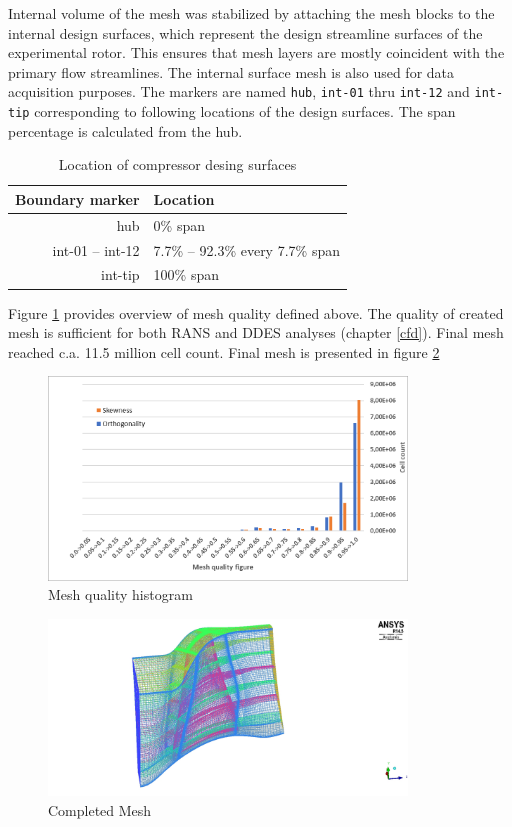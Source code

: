 Internal volume of the mesh was stabilized by attaching the mesh blocks to the internal design surfaces, which represent the design streamline surfaces of the experimental rotor. This ensures that mesh layers are mostly coincident with the primary flow streamlines. The internal surface mesh is also used for data acquisition purposes. The markers are named \texttt{hub}, \texttt{int-01} thru \texttt{int-12} and \texttt{int-tip} corresponding to following locations of the design surfaces. The span percentage is calculated from the hub.

\begin{table}[htb!]
\centering
\caption{Location of compressor desing surfaces} \label{tab:surfs}
\ttfamily
\begin{tabular}{@{}rl@{}}
\toprule
Boundary marker & Location \\ \midrule
hub & 0\% span  \\
int-01 -- int-12 & 7.7\% -- 92.3\% every 7.7\% span \\
int-tip & 100\% span \\
\bottomrule
\end{tabular}
\end{table}

Figure \ref{mesh-ortho} provides overview of mesh quality defined above. The quality of created mesh is sufficient for both RANS and DDES analyses (chapter \ref{cfd}). Final mesh reached c.a. 11.5 million cell count. Final mesh is presented in figure \ref{meshfinal} 

\begin{figure}[h!]
\centering %
\includegraphics[width=0.85\textwidth]{Pictures/mesh_ortho.png}
\caption{Mesh quality histogram}
\label{mesh-ortho}
\end{figure}

\begin{figure}[t!]
\centering %
\includegraphics[width=0.85\textwidth]{Pictures/r67_ransmesh.jpg}
\caption{Completed Mesh}
\label{meshfinal}
\end{figure}

